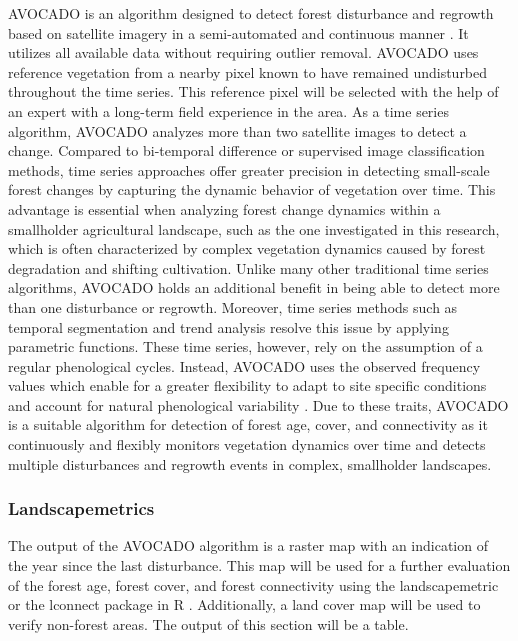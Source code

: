 AVOCADO is an algorithm designed to detect forest disturbance and regrowth based on satellite imagery in a semi-automated and continuous manner \citep{decuyperContinuousMonitoringForest2022}. It utilizes all available data without requiring outlier removal. AVOCADO uses reference vegetation from a nearby pixel known to have remained undisturbed throughout the time series. This reference pixel will be selected with the help of an expert with a long-term field experience in the area. As a time series algorithm, AVOCADO analyzes more than two satellite images to detect a change. Compared to bi-temporal difference or supervised image classification methods, time series approaches offer greater precision in detecting small-scale forest changes by capturing the dynamic behavior of vegetation over time. This advantage is essential when analyzing forest change dynamics within a smallholder agricultural landscape, such as the one investigated in this research, which is often characterized by complex vegetation dynamics caused by forest degradation and shifting cultivation. Unlike many other traditional time series algorithms, AVOCADO holds an additional benefit in being able to detect more than one disturbance or regrowth. Moreover, time series methods such as temporal segmentation and trend analysis resolve this issue by applying parametric functions. These time series, however, rely on the assumption of a regular phenological cycles. Instead, AVOCADO uses the observed frequency values which enable for a greater flexibility to adapt to site specific conditions and account for natural phenological variability \citep{decuyperContinuousMonitoringForest2022}. Due to these traits, AVOCADO is a suitable algorithm for detection of forest age, cover, and connectivity as it continuously and flexibly monitors vegetation dynamics over time and detects multiple disturbances and regrowth events in complex, smallholder landscapes.

\subsubsection{Landscapemetrics}
The output of the AVOCADO algorithm is a raster map with an indication of the year since the last disturbance. This map will be used for a further evaluation of the forest age, forest cover, and forest connectivity using the landscapemetric or the lconnect package in R \citep{mestreLconnectPackageVersatile2023, hesselbarthLandscapemetricsOpensourceTool2019}. Additionally, a land cover map will be used to verify non-forest areas. The output of this section will be a table.

